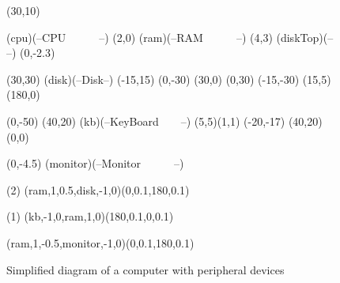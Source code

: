 


\begin {figure}

\Draw

\MinNodeSize(30,10)

\RectNode(cpu)(--CPU~~~~~~--)
\MoveToExit(2,0)
\RectNode(ram)(--RAM~~~~~~--)
\MoveToExit(4,3)
\OvalNode(diskTop)(-- --)
\MoveToExit(0,-2.3)

\MinNodeSize(30,30)
\Node(disk)(--Disk--)
\Move(-15,15)
\Line(0,-30)
\Move(30,0)
\Line(0,30)
\Move(-15,-30)
\DrawOvalArc(15,5)(180,0)

\Move(0,-50)
\MinNodeSize(40,20)
\RectNode(kb)(--KeyBoard~~~~--)
\SetBrush(5,5){\PaintRect(1,1)}
\Move(-20,-17)
\PaintRect(40,20)
\SetBrush(0,0){ }

\MoveToExit(0,-4.5)
\RRectNode(monitor)(--Monitor~~~~~~--)



\ArrowHeads(2)
\CurvedEdgeAt(ram,1,0.5,disk,-1,0)(0,0.1,180,0.1)

\ArrowHeads(1)
\CurvedEdgeAt(kb,-1,0,ram,1,0)(180,0.1,0,0.1)

\CurvedEdgeAt(ram,1,-0.5,monitor,-1,0)(0,0.1,180,0.1)



\EndDraw


\caption {Simplified diagram of a computer with peripheral 
devices}

\label {fig:computer}

\end {figure}

